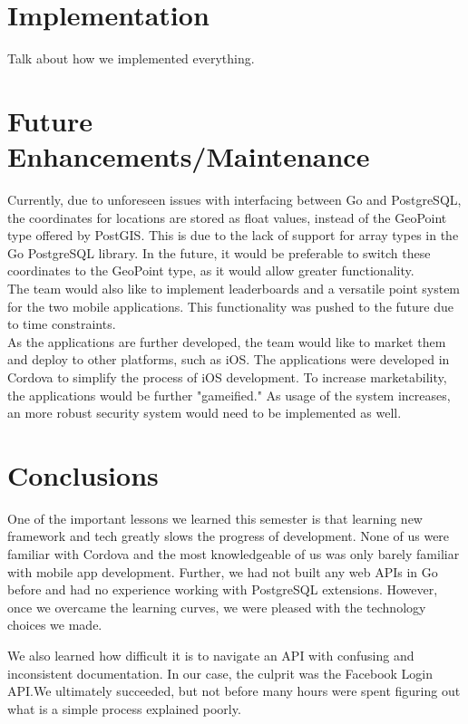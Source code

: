 \documentclass{article}
\begin{document}
\section{Implementation}
Talk about how we implemented everything.

\section{Future Enhancements/Maintenance}
Currently, due to unforeseen issues with interfacing between Go and PostgreSQL, the coordinates for locations are stored as float values, instead of the GeoPoint type offered by PostGIS. This is due to the lack of support for array types in the Go PostgreSQL library. In the future, it would be preferable to switch these coordinates to the GeoPoint type, as it would allow greater functionality.\\

The team would also like to implement leaderboards and a versatile point system for the two mobile applications. This functionality was pushed to the future due to time constraints. \\

As the applications are further developed, the team would like to market them and deploy to other platforms, such as iOS. The applications were developed in Cordova to simplify the process of iOS development. To increase marketability, the applications would be further "gameified." As usage of the system increases, an more robust security system would need to be implemented as well. 

\section{Conclusions}

One of the important lessons we learned this semester is that learning new
framework and tech greatly slows the progress of development. None of us were
familiar with Cordova and the most knowledgeable of us was only barely familiar
with mobile app development. Further, we had not built any web APIs in Go
before and had no experience working with PostgreSQL extensions. However, once
we overcame the learning curves, we were pleased with the technology choices we
made.

We also learned how difficult it is to navigate an API with confusing and
inconsistent documentation. In our case, the culprit was the Facebook Login
API.\@ We ultimately succeeded, but not before many hours were spent figuring out
what is a simple process explained poorly.
\end{document}
